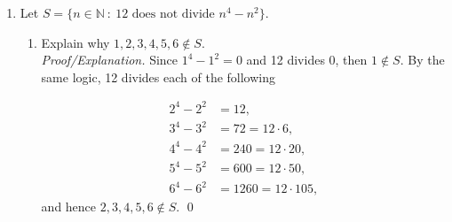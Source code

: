 \documentclass[12pt]{article}
\begin{document}
\begin{enumerate}
	Now since $t = 2(2ab+a+b)$ is an integer, then $x^{n+1}=2t+1$ is odd. \qed
	
	(c) Suppose $n\in S$ and we will show that if $x^{n+1}$ is odd then $x$ is odd.  We will prove this by showing the converse, so suppose $x$ is even and we will show that $x^{n+1}$ is even.  Since $x$ is even then there is some integer $k$ such that $x=2k$.  Now we have 
	\begin{align*}
	    x^{n+1} = x\cdot x^n = 2kx^n.
	\end{align*}
	
	Since $t=kx^n$ is an integer then $x^{n+1}=2t$ is even. \qed
	
	(d) {\it Explanation:}  Parts (b) and (c) together show that if $n\in S$ then $x$ is odd if and only if $x^{n+1}$ is odd.  This consequent is the same thing as the condition for $n+1\in S$.  Hence parts (b) and (c) show that if $n\in S$ then $n+1\in S$. \qed
	
	We may choose to set $n=1$ since the above holds for every natural number.  Then we have that if $1\in S$ then $2\in S$.  From part (a) we know that $1\in S$.  Therefore we conclude that $2\in S$. 
	
	(e) {\emph Explanation:} Part (a) establishes the base-case.  Parts (b) and (c) together establish the inductive case.  Hence by the Principle of Mathematical Induction, we have that $S=\mathbb N$.  That is to say, for every natural number $n$, and for every integer $x$, we have that $x$ is odd if and only if $x^n$ is odd. \qed \\

	
\item Let $S = \{n \in \mathbb{N} \ : \ 12 \text{ does not divide } n^4 - n^2 \}$.
	\begin{enumerate}
	\item Explain why $1, 2, 3, 4, 5, 6 \not\in S$. \\
	
	\emph{Proof/Explanation.}  Since $1^4-1^2=0$ and 12 divides 0, then $1\not\in S$.  By the same logic, 12 divides each of the following 
	
	\begin{align*}
	    2^4-2^2 &= 12,\\
	    3^4-3^2 &= 72=12\cdot 6,\\
	    4^4-4^2 &= 240 = 12\cdot 20,\\
	    5^4-5^2 &= 600 = 12\cdot 50, \\
	    6^4-6^2 &= 1260 = 12\cdot 105,
	\end{align*}
	and hence $2,3,4,5,6\not\in S$. \qed \\
	

\end{enumerate}
\end{enumerate}
\end{document}
